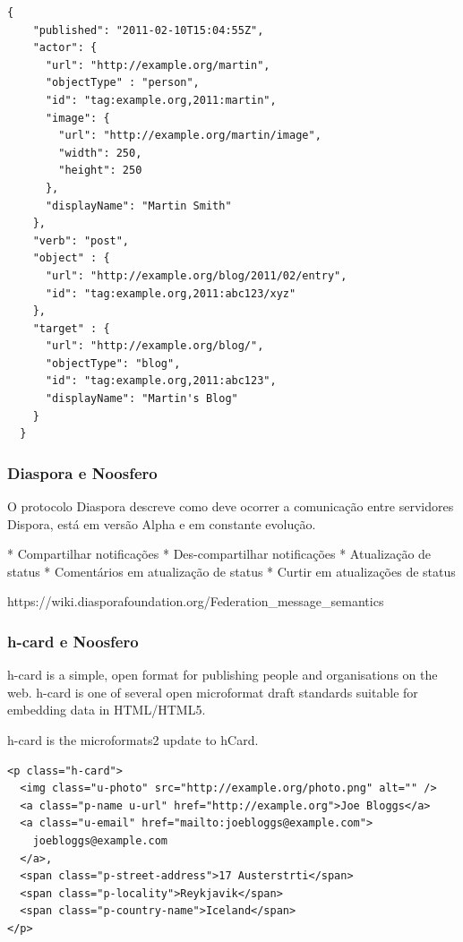 \documentclass[12pt]{article}
\begin{document}
\begin{framed}
\begin{lstlisting}[caption=Exemplo simples de atividade JSON serielizada]
  {
    "published": "2011-02-10T15:04:55Z",
    "actor": {
      "url": "http://example.org/martin",
      "objectType" : "person",
      "id": "tag:example.org,2011:martin",
      "image": {
        "url": "http://example.org/martin/image",
        "width": 250,
        "height": 250
      },
      "displayName": "Martin Smith"
    },
    "verb": "post",
    "object" : {
      "url": "http://example.org/blog/2011/02/entry",
      "id": "tag:example.org,2011:abc123/xyz"
    },
    "target" : {
      "url": "http://example.org/blog/",
      "objectType": "blog",
      "id": "tag:example.org,2011:abc123",
      "displayName": "Martin's Blog"
    }
  }
\end{lstlisting}
\end{framed}

\subsubsection{Diaspora e Noosfero}

O protocolo Diaspora descreve como deve ocorrer a comunicação entre servidores
Dispora, está em versão Alpha e em constante evolução.

* Compartilhar notificações
* Des-compartilhar notificações
* Atualização de status
* Comentários em atualização de status
* Curtir em atualizações de status

https://wiki.diasporafoundation.org/Federation\_message\_semantics

\subsubsection{h-card e Noosfero}

h-card is a simple, open format for publishing people and organisations on the web. h-card is one of several open microformat draft standards suitable for embedding data in HTML/HTML5.

h-card is the microformats2 update to hCard.

\begin{framed}
\begin{lstlisting}[caption=Exemplo de h-card]
<p class="h-card">
  <img class="u-photo" src="http://example.org/photo.png" alt="" />
  <a class="p-name u-url" href="http://example.org">Joe Bloggs</a>
  <a class="u-email" href="mailto:joebloggs@example.com">
    joebloggs@example.com
  </a>, 
  <span class="p-street-address">17 Austerstrti</span>
  <span class="p-locality">Reykjavik</span>
  <span class="p-country-name">Iceland</span>
</p>
\end{lstlisting}
\end{framed}
\end{document}
